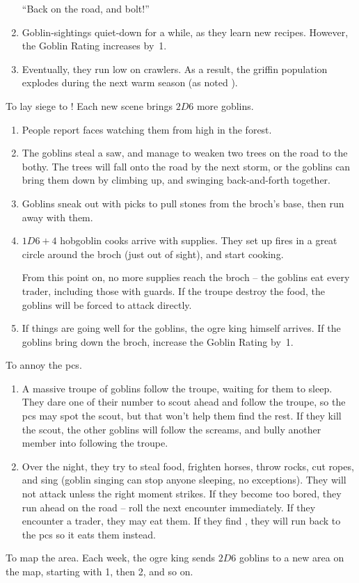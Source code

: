 \begin{multicols}{2}
\begin{dlist}
\begin{enumerate}
    ``Back on the road, and bolt!''
    \item
    Goblin-sightings quiet-down for a while, as they learn new recipes.
    However, the Goblin Rating increases by~1.
    \item
    Eventually, they run low on \glspl{crawler}.
    As a result, the griffin population explodes during the next warm season (as noted ).
  \end{enumerate}
  \item
  To lay siege to !
  Each new scene brings $2D6$ more goblins.
  \begin{enumerate}
    \item
    People report faces watching them from high in the forest.
    \item
    The goblins steal a saw, and manage to weaken two trees on the road to the \gls{bothy}.
    The trees will fall onto the road by the next storm, or the goblins can bring them down by climbing up, and swinging back-and-forth together.
    \item
    Goblins sneak out with picks to pull stones from the \gls{broch}'s base, then run away with them.
    \item
    $1D6+4$ hobgoblin cooks arrive with supplies.
    They set up fires in a great circle around the \gls{broch} (just out of sight), and start cooking.

    From this point on, no more supplies reach the \gls{broch} -- the goblins eat every trader, including those with \glspl{guard}.
    If the troupe destroy the food, the goblins will be forced to attack directly.
    \item
    If things are going well for the goblins, the \gls{ogre} king himself arrives.
    If the goblins bring down the \gls{broch}, increase the Goblin Rating by~1.
  \end{enumerate}
  \item
  To annoy the \glspl{pc}.
  \begin{enumerate}
    \item
    A massive troupe of goblins follow the troupe, waiting for them to sleep.
    They dare one of their number to scout ahead and follow the troupe, so the \glspl{pc} may spot the scout, but that won't help them find the rest.
    If they kill the scout, the other goblins will follow the screams, and bully another member into following the troupe.
    \item
    Over the night, they try to steal food, frighten horses, throw rocks, cut ropes, and sing (goblin singing can stop anyone sleeping, no exceptions).
    They will not attack unless the right moment strikes.
    If they become too bored, they run ahead on the road -- roll the next encounter immediately.
    If they encounter a trader, they may eat them.
    If they find , they will run back to the \glspl{pc} so it eats them instead.
  \end{enumerate}
  \item
  To map the area.
  Each week, the \gls{ogre} king sends $2D6$ goblins to a new area on the map, starting with 1, then 2, and so on.


\end{dlist}
\end{multicols}
